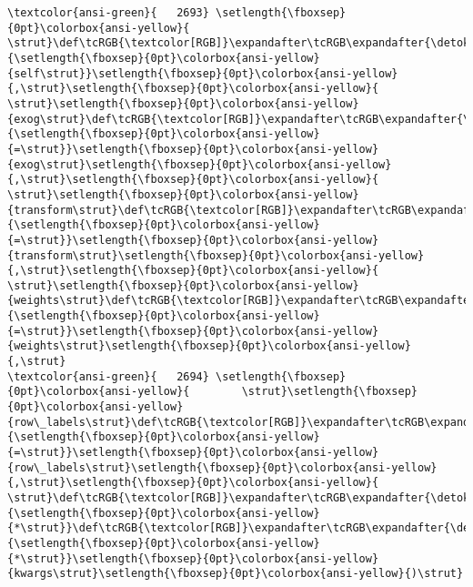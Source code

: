 \documentclass[11pt]{article}
\begin{document}
\begin{Verbatim}[commandchars=\\\{\}, frame=single, framerule=2mm, rulecolor=\color{outerrorbackground}]
\textcolor{ansi-green}{   2693} \setlength{\fboxsep}{0pt}\colorbox{ansi-yellow}{        \strut}\def\tcRGB{\textcolor[RGB]}\expandafter\tcRGB\expandafter{\detokenize{0,135,0}}{\setlength{\fboxsep}{0pt}\colorbox{ansi-yellow}{self\strut}}\setlength{\fboxsep}{0pt}\colorbox{ansi-yellow}{,\strut}\setlength{\fboxsep}{0pt}\colorbox{ansi-yellow}{ \strut}\setlength{\fboxsep}{0pt}\colorbox{ansi-yellow}{exog\strut}\def\tcRGB{\textcolor[RGB]}\expandafter\tcRGB\expandafter{\detokenize{98,98,98}}{\setlength{\fboxsep}{0pt}\colorbox{ansi-yellow}{=\strut}}\setlength{\fboxsep}{0pt}\colorbox{ansi-yellow}{exog\strut}\setlength{\fboxsep}{0pt}\colorbox{ansi-yellow}{,\strut}\setlength{\fboxsep}{0pt}\colorbox{ansi-yellow}{ \strut}\setlength{\fboxsep}{0pt}\colorbox{ansi-yellow}{transform\strut}\def\tcRGB{\textcolor[RGB]}\expandafter\tcRGB\expandafter{\detokenize{98,98,98}}{\setlength{\fboxsep}{0pt}\colorbox{ansi-yellow}{=\strut}}\setlength{\fboxsep}{0pt}\colorbox{ansi-yellow}{transform\strut}\setlength{\fboxsep}{0pt}\colorbox{ansi-yellow}{,\strut}\setlength{\fboxsep}{0pt}\colorbox{ansi-yellow}{ \strut}\setlength{\fboxsep}{0pt}\colorbox{ansi-yellow}{weights\strut}\def\tcRGB{\textcolor[RGB]}\expandafter\tcRGB\expandafter{\detokenize{98,98,98}}{\setlength{\fboxsep}{0pt}\colorbox{ansi-yellow}{=\strut}}\setlength{\fboxsep}{0pt}\colorbox{ansi-yellow}{weights\strut}\setlength{\fboxsep}{0pt}\colorbox{ansi-yellow}{,\strut}
\textcolor{ansi-green}{   2694} \setlength{\fboxsep}{0pt}\colorbox{ansi-yellow}{        \strut}\setlength{\fboxsep}{0pt}\colorbox{ansi-yellow}{row\_labels\strut}\def\tcRGB{\textcolor[RGB]}\expandafter\tcRGB\expandafter{\detokenize{98,98,98}}{\setlength{\fboxsep}{0pt}\colorbox{ansi-yellow}{=\strut}}\setlength{\fboxsep}{0pt}\colorbox{ansi-yellow}{row\_labels\strut}\setlength{\fboxsep}{0pt}\colorbox{ansi-yellow}{,\strut}\setlength{\fboxsep}{0pt}\colorbox{ansi-yellow}{ \strut}\def\tcRGB{\textcolor[RGB]}\expandafter\tcRGB\expandafter{\detokenize{98,98,98}}{\setlength{\fboxsep}{0pt}\colorbox{ansi-yellow}{*\strut}}\def\tcRGB{\textcolor[RGB]}\expandafter\tcRGB\expandafter{\detokenize{98,98,98}}{\setlength{\fboxsep}{0pt}\colorbox{ansi-yellow}{*\strut}}\setlength{\fboxsep}{0pt}\colorbox{ansi-yellow}{kwargs\strut}\setlength{\fboxsep}{0pt}\colorbox{ansi-yellow}{)\strut}


\end{Verbatim}
\end{document}
